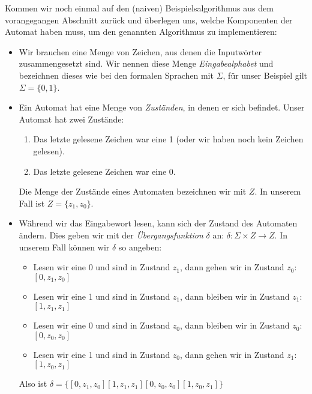 Kommen wir noch einmal auf den (naiven) Beispielsalgorithmus
aus dem vorangegangen Abschnitt zurück
und überlegen uns, welche Komponenten der Automat haben muss,
um den genannten Algorithmus zu implementieren:
\begin{itemize}
    \item Wir brauchen eine Menge von Zeichen,
        aus denen die Inputwörter zusammengesetzt sind.
        Wir nennen diese Menge \emph{Eingabealphabet}
        und bezeichnen dieses wie bei den formalen Sprachen mit $\Sigma$,
        für unser Beispiel gilt $\Sigma = \{0,1\}$.

    \item Ein Automat hat eine Menge von \emph{Zuständen}, in denen er sich befindet.
        Unser Automat hat zwei Zustände:
        \begin{enumerate}
            \item Das letzte gelesene Zeichen war eine 1
                (oder wir haben noch kein Zeichen gelesen).
            \item Das letzte gelesene Zeichen war eine 0.
        \end{enumerate}
        Die Menge der Zustände eines Automaten bezeichnen wir mit $Z$.
        In unserem Fall ist $Z = \{z_1, z_0\}$.

    \item Während wir das Eingabewort lesen,
        kann sich der Zustand des Automaten ändern.
        Dies geben wir mit der \emph{Übergangsfunktion} $\delta$ an:
        $\delta: \Sigma \times Z \rightarrow Z$.
        In unserem Fall können wir $\delta$ so angeben:
        \begin{itemize}
            \item Lesen wir eine 0 und sind in Zustand $z_1$,
                dann gehen wir in Zustand $z_0$:\linebreak
                $[0,z_1,z_0]$
            \item Lesen wir eine 1 und sind in Zustand $z_1$,
                dann bleiben wir in Zustand $z_1$:\linebreak
                $[1,z_1,z_1]$
            \item Lesen wir eine 0 und sind in Zustand $z_0$,
                dann bleiben wir in Zustand $z_0$:\linebreak
                $[0,z_0,z_0]$
            \item Lesen wir eine 1 und sind in Zustand $z_0$,
                dann gehen wir in Zustand $z_1$:\linebreak
                $[1,z_0,z_1]$
        \end{itemize}
        Also ist $\delta = \{[0,z_1,z_0] [1,z_1,z_1] [0,z_0,z_0] [1,z_0,z_1]\}$


\end{itemize}
